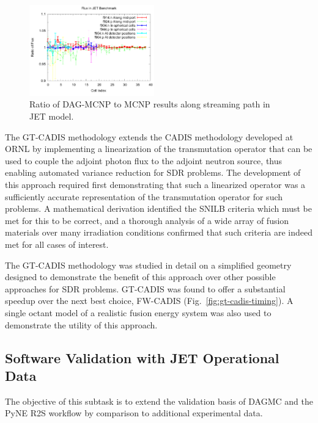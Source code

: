 \begin{figure}
\centering
\includegraphics[width=0.48\textwidth]{imgs/jet-streaming-benchmark.png}
\caption{\label{fig:jet-streaming-benchmark}Ratio of DAG-MCNP to MCNP results
  along streaming path in JET model.}
\end{figure}

The \gls{GT-CADIS} methodology extends the \gls{CADIS} methodology developed
at \gls{ORNL} by implementing a linearization of the transmutation operator
that can be used to couple the adjoint photon flux to the adjoint neutron
source, thus enabling automated variance reduction for \gls{SDR} problems.
The development of this approach required first demonstrating that such a
linearized operator was a sufficiently accurate representation of the
transmutation operator for such problems.  A mathematical derivation
identified the \gls{SNILB} criteria which must be met for this to be correct,
and a thorough analysis of a wide array of fusion materials over many
irradiation conditions confirmed that such criteria are indeed met for all
cases of interest.

The \gls{GT-CADIS} methodology was studied in detail on a simplified geometry
designed to demonstrate the benefit of this approach over other possible
approaches for \gls{SDR} problems.  \gls{GT-CADIS} was found to offer a
substantial speedup over the next best choice, \gls{FW-CADIS}
(Fig.\ \ref{fig:gt-cadis-timing}).\cite{biondo_gtcadis} A single octant model
of a realistic fusion energy system was also used to demonstrate the utility
of this approach.\cite{biondo_thesis}

\subsection{Software Validation with JET Operational Data}

The objective of this subtask is to extend the validation basis of \gls{DAGMC}
and the PyNE \gls{R2S} workflow by comparison to additional experimental data.

